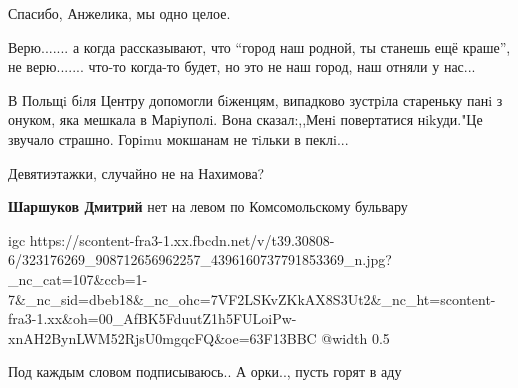  
 
 
 
 

\qqSecCmt


Спасибо, Анжелика, мы одно целое.


Верю....... а когда рассказывают, что \enquote{город наш родной, ты станешь ещё краше}, не
верю....... что-то когда-то будет, но это не наш город, наш отняли у нас...


В Польщi бiля Центру допомогли бiженцям, випадково зустрiла стареньку панi з
онуком, яка мешкала в Марiуполi. Вона сказал:,,Менi повертатися нikуди."Це
звучало страшно. Горimu мокшанам не тiльки в пеклi...


Девятиэтажки, случайно не на Нахимова?

\begin{itemize} %
\textbf{Шаршуков Дмитрий} нет на левом по Комсомольскому бульвару
\end{itemize} %


\ifcmt
  igc https://scontent-fra3-1.xx.fbcdn.net/v/t39.30808-6/323176269_908712656962257_4396160737791853369_n.jpg?_nc_cat=107&ccb=1-7&_nc_sid=dbeb18&_nc_ohc=7VF2LSKvZKkAX8S3Ut2&_nc_ht=scontent-fra3-1.xx&oh=00_AfBK5FduutZ1h5FULoiPw-xnAH2BynLWM52RjsU0mgqcFQ&oe=63F13BBC
	@width 0.5
\fi



Под каждым словом подписываюсь.. А орки.., пусть горят в аду
